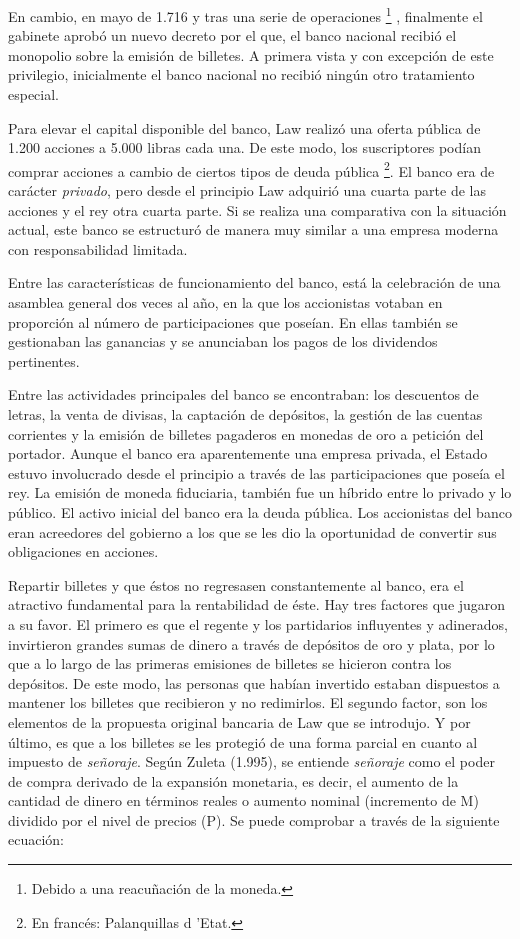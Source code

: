 En cambio, en mayo de 1.716 y tras una serie de operaciones 	\footnote{Debido a una reacuñación de la moneda.}
, finalmente el gabinete aprobó un nuevo decreto por el que, el banco nacional recibió el monopolio sobre la emisión de billetes. A primera vista y con excepción de este privilegio, inicialmente el banco nacional no recibió ningún otro tratamiento especial. 

Para elevar el capital disponible del banco, Law realizó una oferta pública de 1.200 acciones a 5.000 libras cada una. De este modo, los suscriptores podían comprar acciones a cambio de ciertos tipos de deuda pública \footnote{En francés: Palanquillas d 'Etat.}. El banco era de carácter \emph{privado}, pero desde el principio Law adquirió una cuarta parte de las acciones y el rey otra cuarta parte. Si se realiza una comparativa con la situación actual, este banco se estructuró de manera muy similar a una empresa moderna con responsabilidad limitada.

Entre las características de funcionamiento del banco, está la celebración de una asamblea general dos veces al año, en la que los accionistas votaban en proporción al número de participaciones que poseían. En ellas también se gestionaban las ganancias y se anunciaban los pagos de los dividendos pertinentes.

Entre las actividades principales del banco se encontraban: los descuentos de letras, la venta de divisas, la captación de depósitos, la gestión de las cuentas corrientes y la emisión de billetes pagaderos en monedas de oro a petición del portador. Aunque el banco era aparentemente una empresa privada, el Estado estuvo involucrado desde el principio a través de las participaciones que poseía el rey. La emisión de moneda fiduciaria, también fue un híbrido entre lo privado y lo público. El activo inicial del banco era la deuda pública. Los accionistas del banco eran acreedores del gobierno a los que se les dio la oportunidad de convertir sus obligaciones en acciones. 

Repartir billetes y que éstos no regresasen constantemente al banco, era el atractivo fundamental para la rentabilidad de éste. Hay tres factores que jugaron a su favor. El primero es que el regente y los partidarios influyentes y adinerados, invirtieron grandes sumas de dinero a través de depósitos de oro y plata, por lo que a lo largo de las primeras emisiones de billetes se hicieron contra los depósitos. De este modo, las personas que habían invertido estaban dispuestos a mantener los billetes que recibieron y no redimirlos. El segundo factor, son los elementos de la propuesta original bancaria de Law que se introdujo. Y por último, es que a los billetes se les protegió de una forma parcial en cuanto al impuesto de \emph{señoraje}. Según Zuleta (1.995), se entiende \emph{señoraje} como el poder de compra derivado de la expansión monetaria, es decir, el aumento de la cantidad de dinero en términos reales o aumento nominal (incremento de M) dividido por el nivel de precios (P). Se puede comprobar a través de la siguiente ecuación: 

